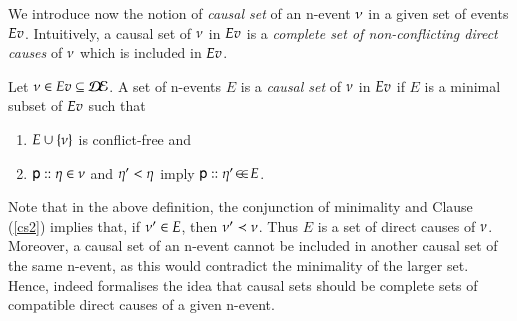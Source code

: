 We introduce now the notion of \emph{causal set} of an n-event
$\nu$ in a given set of events $Ev$. Intuitively, a causal set
of $\nu$ in $Ev$ is a \emph{complete set of non-conflicting
direct causes} of $\nu$ which is included in $Ev$.

\begin{definition}
Let $\nu\in Ev \subseteq \mathcal{D\!E}$. 
A set of n-events $E$ is a {\em causal set} of $\nu$ in
$Ev$ if $E$ is a minimal subset of $Ev$ such that
\begin{enumerate}
\item {} $E \cup \{\nu\}$ is conflict-free and  
\item {} ${\sf p}:: \eta\in\nu$ and $\eta' <
  \eta$ 
imply ${\sf p}:: \eta'\!\in\!\in\!E$.
\end{enumerate}
\end{definition} 

Note that in the above definition, the conjunction of minimality and
Clause (\ref{cs2}) implies that, if $\nu'\in E$, then
$\nu'\prec\nu$. Thus $E$ is a set of direct causes of $\nu$.
Moreover, a causal set of an n-event cannot be included in another
causal set of the same n-event, as this would contradict the
minimality of the larger set. Hence,  indeed formalises
the idea that causal sets should be complete sets of compatible direct
causes of a given n-event.


